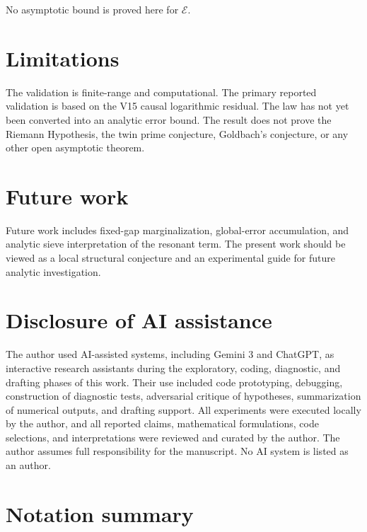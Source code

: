 \documentclass[11pt]{article}
\begin{document}
No asymptotic bound is proved here for \(\mathcal{E}\).

\section{Limitations}

The validation is finite-range and computational. The primary reported validation is based on the V15 causal logarithmic residual. The law has not yet been converted into an analytic error bound. The result does not prove the Riemann Hypothesis, the twin prime conjecture, Goldbach's conjecture, or any other open asymptotic theorem.

\section{Future work}

Future work includes fixed-gap marginalization, global-error accumulation, and analytic sieve interpretation of the resonant term. The present work should be viewed as a local structural conjecture and an experimental guide for future analytic investigation.

\section{Disclosure of AI assistance}

The author used AI-assisted systems, including Gemini 3 and ChatGPT, as interactive research assistants during the exploratory, coding, diagnostic, and drafting phases of this work. Their use included code prototyping, debugging, construction of diagnostic tests, adversarial critique of hypotheses, summarization of numerical outputs, and drafting support. All experiments were executed locally by the author, and all reported claims, mathematical formulations, code selections, and interpretations were reviewed and curated by the author. The author assumes full responsibility for the manuscript. No AI system is listed as an author.

\appendix

\section{Notation summary}
\end{document}

